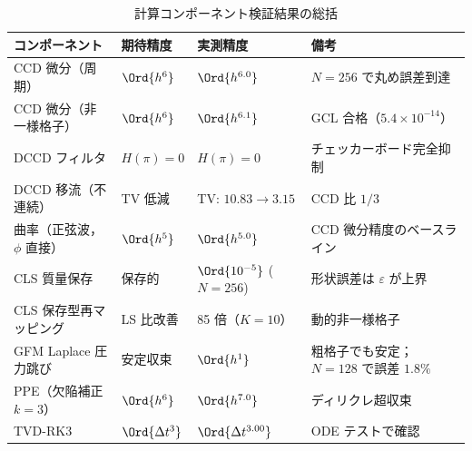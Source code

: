 \begin{table}[htbp]
\centering
\caption{計算コンポーネント検証結果の総括}
\label{tab:verification_summary}
\begin{tabular}{llll}
\toprule
コンポーネント & 期待精度 & 実測精度 & 備考 \\
\midrule
CCD 微分（周期） & $\Ord{h^6}$ & $\Ord{h^{6.0}}$ & $N = 256$ で丸め誤差到達 \\
CCD 微分（非一様格子） & $\Ord{h^6}$ & $\Ord{h^{6.1}}$ & GCL 合格（$5.4 \times 10^{-14}$） \\
DCCD フィルタ   & $H(\pi) = 0$ & $H(\pi) = 0$ & チェッカーボード完全抑制 \\
DCCD 移流（不連続） & TV 低減 & TV: $10.83 \to 3.15$ & CCD 比 $1/3$ \\
曲率（正弦波，$\phi$ 直接） & $\Ord{h^5}$ & $\Ord{h^{5.0}}$ & CCD 微分精度のベースライン \\
CLS 質量保存    & 保存的     & $\Ord{10^{-5}}$ ($N=256$) & 形状誤差は $\varepsilon$ が上界 \\
CLS 保存型再マッピング & LS 比改善 & 85 倍（$K=10$） & 動的非一様格子 \\
GFM Laplace 圧力跳び & 安定収束 & $\Ord{h^1}$ & 粗格子でも安定；$N=128$ で誤差 $1.8\%$ \\
PPE（欠陥補正 $k{=}3$） & $\Ord{h^6}$ & $\Ord{h^{7.0}}$ & ディリクレ超収束 \\
TVD-RK3         & $\Ord{\Delta t^3}$ & $\Ord{\Delta t^{3.00}}$ & ODE テストで確認 \\
\bottomrule
\end{tabular}
\end{table}
